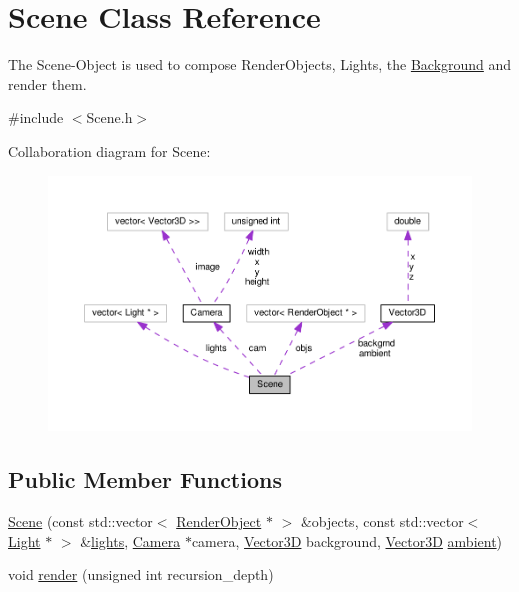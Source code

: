 \hypertarget{classScene}{}\section{Scene Class Reference}
\label{classScene}


The Scene-\/\+Object is used to compose Render\+Objects, Lights, the \hyperlink{classBackground}{Background} and render them.  




{\ttfamily \#include $<$Scene.\+h$>$}



Collaboration diagram for Scene\+:\nopagebreak
\begin{figure}[H]
\begin{center}
\leavevmode
\includegraphics[width=350pt]{classScene__coll__graph}
\end{center}
\end{figure}
\subsection*{Public Member Functions}
\begin{DoxyCompactItemize}
\item 
\hyperlink{classScene_a051f10cca42dcc9c5fe5297ef06583f8}{Scene} (const std\+::vector$<$ \hyperlink{classRenderObject}{Render\+Object} $\ast$ $>$ \&objects, const std\+::vector$<$ \hyperlink{classLight}{Light} $\ast$ $>$ \&\hyperlink{classScene_a4ecc3182a80435e1c4dfbe1b20e559bd}{lights}, \hyperlink{classCamera}{Camera} $\ast$camera, \hyperlink{classVector3D}{Vector3D} background, \hyperlink{classVector3D}{Vector3D} \hyperlink{classScene_a284ce5b2aeb47c64d6712d9748229c47}{ambient})
\item 
void \hyperlink{classScene_a19a594ba70c411fb6fddb1e9d772da52}{render} (unsigned int recursion\+\_\+depth)
\end{DoxyCompactItemize}
